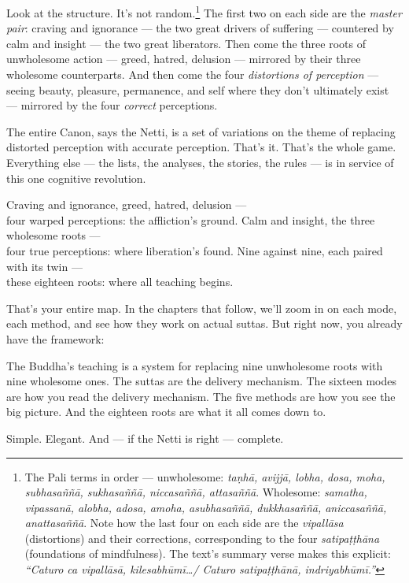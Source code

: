 Look at the structure. It's not random.\footnote{The Pali terms in order --- unwholesome: \textit{taṇhā, avijjā, lobha, dosa, moha, subhasaññā, sukhasaññā, niccasaññā, attasaññā}. Wholesome: \textit{samatha, vipassanā, alobha, adosa, amoha, asubhasaññā, dukkhasaññā, aniccasaññā, anattasaññā}. Note how the last four on each side are the \textit{vipallāsa} (distortions) and their corrections, corresponding to the four \textit{satipaṭṭhāna} (foundations of mindfulness). The text's summary verse makes this explicit: \textit{``Caturo ca vipallāsā, kilesabhūmī\ldots / Caturo satipaṭṭhānā, indriyabhūmī.''}} The first two on each side are the \textit{master pair}: craving and ignorance --- the two great drivers of suffering --- countered by calm and insight --- the two great liberators. Then come the three roots of unwholesome action --- greed, hatred, delusion --- mirrored by their three wholesome counterparts. And then come the four \textit{distortions of perception} --- seeing beauty, pleasure, permanence, and self where they don't ultimately exist --- mirrored by the four \textit{correct} perceptions.

The entire Canon, says the Netti, is a set of variations on the theme of replacing distorted perception with accurate perception. That's it. That's the whole game. Everything else --- the lists, the analyses, the stories, the rules --- is in service of this one cognitive revolution.

\begin{versebox}
Craving and ignorance, greed, hatred, delusion ---\\
four warped perceptions: the affliction's ground.
\stanza
Calm and insight, the three wholesome roots ---\\
four true perceptions: where liberation's found.
\stanza
Nine against nine, each paired with its twin ---\\
these eighteen roots: where all teaching begins.
\end{versebox}

\bigskip

That's your entire map. In the chapters that follow, we'll zoom in on each mode, each method, and see how they work on actual suttas. But right now, you already have the framework:

The Buddha's teaching is a system for replacing nine unwholesome roots with nine wholesome ones. The suttas are the delivery mechanism. The sixteen modes are how you read the delivery mechanism. The five methods are how you see the big picture. And the eighteen roots are what it all comes down to.

Simple. Elegant. And --- if the Netti is right --- complete.
